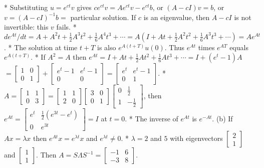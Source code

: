 * Substituting \(u=e^{ct}v\) gives \(ce^{ct}v=Ae^{ct}v-e^{ct}b\), or \((A-cI)v=b\), or \(v=(A-cI)^{-1}b=\) particular solution. If \(c\) is an eigenvalue, then \(A-cI\) is not invertible: this \(v\) fails.
* \(de^{At}/dt=A+A^{2}t+\frac{1}{2}A^{3}t^{2}+\frac{1}{6}A^{4}t^{3}+\cdots=A(I+At+ \frac{1}{2}A^{2}t^{2}+\frac{1}{6}A^{3}t^{3}+\cdots)=Ae^{At}\).
* The solution at time \(t+T\) is also \(e^{A(t+T)}u(0)\). Thus \(e^{At}\) times \(e^{AT}\) equals \(e^{A(t+T)}\).
* If \(A^{2}=A\) then \(e^{At}=I+At+\frac{1}{2}At^{2}+\frac{1}{6}At^{3}+\cdots=I+(e^{t}-1)A\) \(=\left[\begin{matrix}1&0\\ 0&1\end{matrix}\right]+\left[\begin{matrix}e^{t}-1&e^{t}-1\\ 0&0\end{matrix}\right]=\left[\begin{matrix}e^{t}&e^{t}-1\\ 0&1\end{matrix}\right]\).
* \(A=\left[\begin{matrix}1&1\\ 0&3\end{matrix}\right]=\left[\begin{matrix}1&1\\ 2&0\end{matrix}\right]\left[\begin{matrix}3&0\\ 0&1\end{matrix}\right]\left[\begin{matrix}0&\frac{1}{2}\\ 1&-\frac{1}{2}\end{matrix}\right]\), then \(e^{At}=\left[\begin{matrix}e^{t}&\frac{1}{2}(e^{3t}-e^{t})\\ 0&e^{3t}\end{matrix}\right]=I\) at \(t=0\).
* The inverse of \(e^{At}\) is \(e^{-At}\). (b) If \(Ax=\lambda x\) then \(e^{At}x=e^{\lambda t}x\) and \(e^{\lambda t}\neq 0\).
* \(\lambda=2\) and \(5\) with eigenvectors \(\left[\begin{matrix}2\\ 1\end{matrix}\right]\) and \(\left[\begin{matrix}1\\ 1\end{matrix}\right]\). Then \(A=S\Lambda S^{-1}=\left[\begin{matrix}-1&6\\ -3&8\end{matrix}\right]\).

